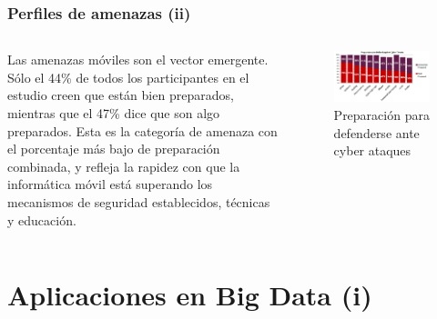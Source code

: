 \documentclass{beamer}
\begin{document}
\begin{frame}
\frametitle{Perfiles de amenazas (ii)}
\begin{columns}[c] %

\textbf{}
Las amenazas móviles son el vector emergente. Sólo el 44\% de todos los participantes en el estudio creen que están bien preparados, mientras que el 47\% dice que son algo preparados. Esta es la categoría de amenaza con el porcentaje más bajo de preparación combinada, y refleja la rapidez con que la informática móvil está superando los mecanismos de seguridad establecidos, técnicas y educación.


\begin{figure}[htb]
\centering
\includegraphics[width=0.50\paperwidth]{img2.png}
\caption{Preparación para defenderse ante cyber ataques}%
\end{figure}

\end{columns}
\end{frame}


\section{Aplicaciones en Big Data (i)}
\end{document}
